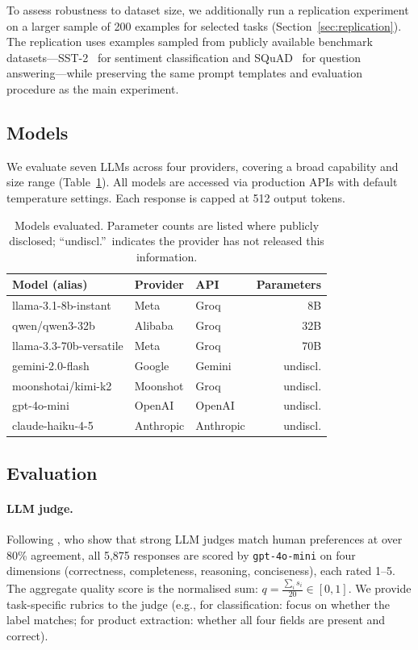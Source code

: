 To assess robustness to dataset size, we additionally run a replication
experiment on a larger sample of 200 examples for selected tasks
(Section~\ref{sec:replication}).
The replication uses examples sampled from publicly available benchmark
datasets---SST-2~\citep{socher2013recursive} for sentiment classification
and SQuAD~\citep{rajpurkar2016squad} for question answering---while preserving
the same prompt templates and evaluation procedure as the main experiment.

\subsection{Models}
\label{sec:models}

We evaluate seven LLMs across four providers, covering a broad capability and
size range (Table~\ref{tab:models}).
All models are accessed via production APIs with default temperature settings.
Each response is capped at 512 output tokens.

\begin{table}[t]
\centering
\caption{Models evaluated. Parameter counts are listed where publicly
  disclosed; ``undiscl.''\ indicates the provider has not released this
  information.}
\label{tab:models}
\small
\begin{tabular}{lllr}
\toprule
Model (alias) & Provider & API & Parameters \\
\midrule
llama-3.1-8b-instant    & Meta       & Groq      & 8B        \\
qwen/qwen3-32b          & Alibaba    & Groq      & 32B       \\
llama-3.3-70b-versatile & Meta       & Groq      & 70B       \\
gemini-2.0-flash        & Google     & Gemini    & undiscl.  \\
moonshotai/kimi-k2      & Moonshot   & Groq      & undiscl.  \\
gpt-4o-mini             & OpenAI     & OpenAI    & undiscl.  \\
claude-haiku-4-5        & Anthropic  & Anthropic & undiscl.  \\
\bottomrule
\end{tabular}
\end{table}

\subsection{Evaluation}
\label{sec:eval}

\paragraph{LLM judge.}
Following \citet{zheng2023judging}, who show that strong LLM judges match
human preferences at over 80\% agreement, all 5,875 responses are scored by
\texttt{gpt-4o-mini} on four dimensions (correctness, completeness,
reasoning, conciseness), each rated 1--5.
The aggregate quality score is the normalised sum:
$q = \frac{\sum_i s_i}{20} \in [0, 1]$.
We provide task-specific rubrics to the judge (e.g., for classification: focus
on whether the label matches; for product extraction: whether all four fields
are present and correct).


